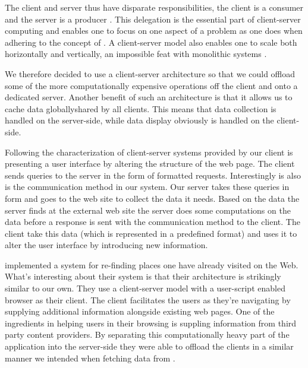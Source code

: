 The client and server thus have disparate responsibilities, the client is a
consumer and the server is a producer \citep[]{lewandowski98}.
This delegation is the
essential part of client-server computing and enables one to focus on one
aspect of a problem as one does when adhering to the concept of
 \citep[]{dijkstra82}.
A client-server model also enables one to scale both horizontally and
vertically,%
an impossible feat with monolithic systems \citep[]{lewandowski98}.

We therefore decided to use a client-server architecture so that we could
offload some of the more computationally expensive operations off the client
and onto a dedicated server. Another benefit of such an architecture is that
it allows us to cache data globally\dash{}shared by all clients. This means
that data collection is handled on the server-side, while data display
obviously is handled on the client-side.

Following the characterization of client-server systems provided by
\citeauthor{sinha92} our client is presenting a user interface
by altering the structure of the \urort{} web page. The client sends queries
to the server in the form of %
formatted requests. Interestingly  is also is the communication
method in our system. Our server takes these queries in  form
and goes to the \urort{} web site to collect the data it needs. Based on the
data the server finds at the external \urort{} web site the server does some
computations on the data before a response is sent
with the  communication method to the client. The client take this
data (which is represented in a predefined format) and uses it to alter the
user interface by introducing new information.

\citet[--888]{nishimoto06} implemented a system for re-finding places
one have already visited on the Web. What's interesting about their system is
that their architecture is strikingly similar to our own. They use a
client-server model with a user-script enabled browser as their client. The
client facilitates the users as they're navigating by supplying additional
information alongside existing web pages. One of the ingredients in helping
users in their browsing is suppling information from third party content
providers. By separating this computationally heavy part of the application
into the server-side they were able to offload the clients in a similar
manner we intended when fetching data from \urort{}.

